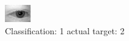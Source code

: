 \begin{figure}[h!]
\begin{center}
\includegraphics[width=0.60\columnwidth]{figures/ID434_class_1_target_2.png}
\end{center}
\caption{ Classification: 1 actual target: 2}
\label{fig:ID434_class_1_target_2}
\end{figure}
